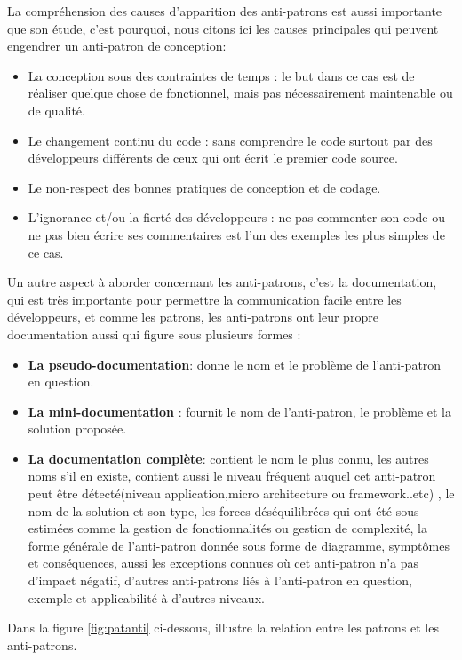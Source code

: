 \vspace{1cm}
La compréhension des causes d'apparition des anti-patrons est aussi importante que son étude, c'est pourquoi, nous citons ici les causes principales qui peuvent engendrer un anti-patron de conception\cite{brown1998antipatterns}:

\begin{itemize}
\item  La conception sous des contraintes de temps : le but dans ce cas est de réaliser quelque chose de fonctionnel, mais pas nécessairement maintenable ou de qualité.
\item Le changement continu du code : sans comprendre le code surtout par des développeurs différents de ceux qui ont écrit le premier code source.
\item Le non-respect des bonnes pratiques de conception et de codage.
\item L’ignorance et/ou la fierté des développeurs : ne pas commenter son code ou ne pas bien écrire ses commentaires est l'un des exemples les plus simples de ce cas.
\end{itemize}
\vspace{1cm}
Un autre aspect à aborder concernant les anti-patrons, c'est la documentation, qui est très importante pour permettre la communication facile entre les développeurs, et comme les patrons, les anti-patrons ont leur propre documentation aussi qui figure sous plusieurs formes :
\begin{itemize}
    

    \item \textbf{La pseudo-documentation}: donne le nom et le problème de l’anti-patron en question.
    \item \textbf{La mini-documentation }: fournit le nom de l’anti-patron, le problème et la solution proposée.
    \item \textbf{La documentation complète}: contient le nom le plus connu, les autres noms s’il en existe, contient aussi le niveau fréquent auquel  cet anti-patron peut être détecté(niveau application,micro architecture ou framework..etc) , le nom de la solution et son type, les forces déséquilibrées qui ont été sous-estimées comme la gestion de fonctionnalités ou gestion de complexité, la forme générale de l’anti-patron donnée sous forme de diagramme, symptômes et conséquences, aussi les exceptions connues où cet anti-patron n’a pas d’impact négatif, d’autres anti-patrons liés à l’anti-patron en question, exemple et applicabilité à d’autres niveaux.
\end{itemize}
\vspace{1cm}
Dans la figure \ref{fig:patanti} ci-dessous, \cite{brown1998antipatterns} illustre la relation entre les patrons et les anti-patrons.

